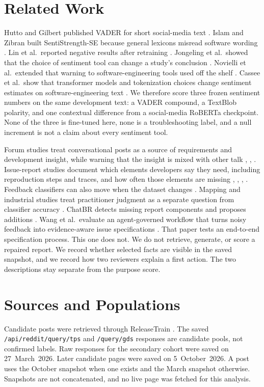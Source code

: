 \documentclass[conference,letterpaper]{IEEEtran}
\begin{document}
\section{Related Work}
Hutto and Gilbert published VADER for short social-media text \cite{Hutto2014VADER}. Islam and Zibran built SentiStrength-SE because general lexicons misread software wording \cite{Islam2018SentiStrengthSE}. Lin et al.\ reported negative results after retraining \cite{Lin2018HowFar}. Jongeling et al.\ showed that the choice of sentiment tool can change a study's conclusion \cite{Jongeling2017Negative}. Novielli et al.\ extended that warning to software-engineering tools used off the shelf \cite{Novielli2021Replication}. Cassee et al.\ show that transformer models and tokenization choices change sentiment estimates on software-engineering text \cite{Cassee2024Transformers}. We therefore score three frozen sentiment numbers on the same development text: a VADER compound, a TextBlob polarity, and one contextual difference from a social-media RoBERTa checkpoint. None of the three is fine-tuned here, none is a troubleshooting label, and a null increment is not a claim about every sentiment tool.

Forum studies treat conversational posts as a source of requirements and development insight, while warning that the insight is mixed with other talk \cite{Tizard2019Forums}, \cite{Wang2024Forums}, \cite{Iqbal2021Reddit}. Issue-report studies document which elements developers say they need, including reproduction steps and traces, and how often those elements are missing \cite{Bettenburg2008GoodReport}, \cite{Chaparro2017Missing}, \cite{Soltani2020Elements}, \cite{Wang2025InformationNeeds}. Feedback classifiers can also move when the dataset changes \cite{Devine2023Transfer}. Mapping and industrial studies treat practitioner judgment as a separate question from classifier accuracy \cite{Laiq2026Mapping}. ChatBR detects missing report components and proposes additions \cite{Bo2024ChatBR}. Wang et al.\ evaluate an agent-governed workflow that turns noisy feedback into evidence-aware issue specifications \cite{Wang2026Evidence}. That paper tests an end-to-end specification process. This one does not. We do not retrieve, generate, or score a repaired report. We record whether selected facts are visible in the saved snapshot, and we record how two reviewers explain a first action. The two descriptions stay separate from the purpose score.

\section{Sources and Populations}
Candidate posts were retrieved through \mbox{ReleaseTrain} \cite{ReleaseTrainDocs}. The saved \texttt{/api/reddit/query/tps} and \texttt{/query/gds} responses are candidate pools, not confirmed labels. Raw responses for the secondary cohort were saved on 27~March~2026. Later candidate pages were saved on 5~October~2026. A post uses the October snapshot when one exists and the March snapshot otherwise. Snapshots are not concatenated, and no live page was fetched for this analysis.
\end{document}
